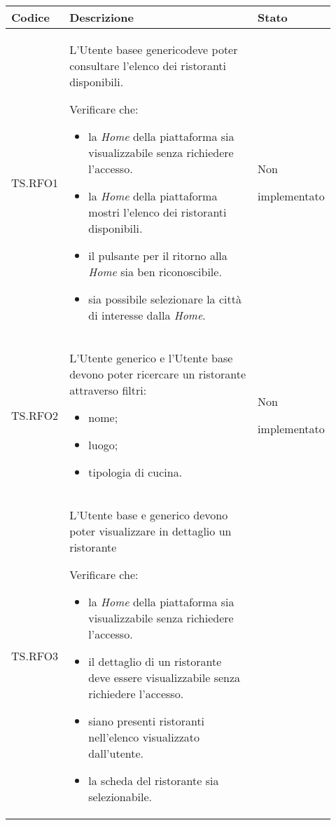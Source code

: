 \fontsize{10}{12}\selectfont
\begin{longtable}{|p{0.10\linewidth}|p{0.70\linewidth}|p{0.12\linewidth}|}
    \hline
	\textbf{Codice} & \textbf{Descrizione} & \textbf{Stato} \\
    \hline
    TS.RFO1 & 
    L'Utente base\g e generico\g deve poter consultare l'elenco dei ristoranti disponibili. \par 
    Verificare che: 
    \begin{itemize}
        \item la \textit{Home} della piattaforma sia visualizzabile senza richiedere l'accesso.
        \item la \textit{Home} della piattaforma mostri l'elenco dei ristoranti disponibili.
        \item il pulsante per il ritorno alla \textit{Home} sia ben riconoscibile.
        \item sia possibile selezionare la città di interesse dalla \textit{Home}.
    \end{itemize}&
    Non \par implementato \\
    \hline
    TS.RFO2 & 
    L’Utente generico e l’Utente base devono poter ricercare un ristorante attraverso filtri: 
    \begin{itemize}
        \item nome;
        \item luogo;
        \item tipologia di cucina.
    \end{itemize}&
    Non \par implementato  \\
    \hline
    TS.RFO3 & 
    L'Utente base e generico devono poter visualizzare in dettaglio un ristorante \par 
    Verificare che: 
    \begin{itemize}
        \item la \textit{Home} della piattaforma sia visualizzabile senza richiedere l'accesso.
        \item il dettaglio di un ristorante deve essere visualizzabile senza richiedere l'accesso.
        \item siano presenti ristoranti nell'elenco visualizzato dall'utente.
        \item la scheda del ristorante sia selezionabile.
    \end{itemize}&

\end{longtable}
